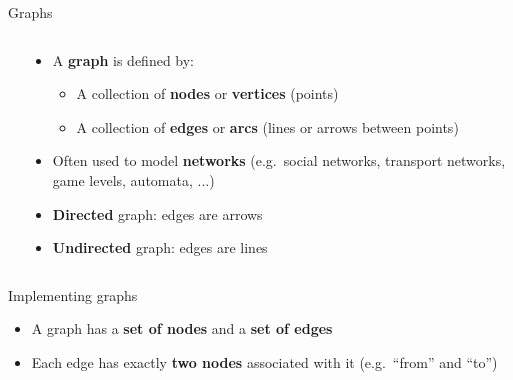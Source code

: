 \begin{frame}{Graphs}
\begin{columns}
\begin{column}{0.3\textwidth}
		\end{column}
		\begin{column}{0.68\textwidth}
			\begin{itemize}
				\pause\item A \textbf{graph} is defined by:
					\begin{itemize}
						\pause\item A collection of \textbf{nodes} or \textbf{vertices} (points)
						\pause\item A collection of \textbf{edges} or \textbf{arcs} (lines or arrows between points)
					\end{itemize}
				\pause\item Often used to model \textbf{networks} (e.g.\ social networks, transport networks, game levels, automata, ...)
				\pause\item \textbf{Directed} graph: edges are arrows
				\pause\item \textbf{Undirected} graph: edges are lines
			\end{itemize}
		\end{column}
	\end{columns}
\end{frame}

\begin{frame}{Implementing graphs}
	\begin{itemize}
		\pause\item A graph has a \textbf{set of nodes} and a \textbf{set of edges}
		\pause\item Each edge has exactly \textbf{two nodes} associated with it (e.g.\ ``from'' and ``to'')
	\end{itemize}
\end{frame}

